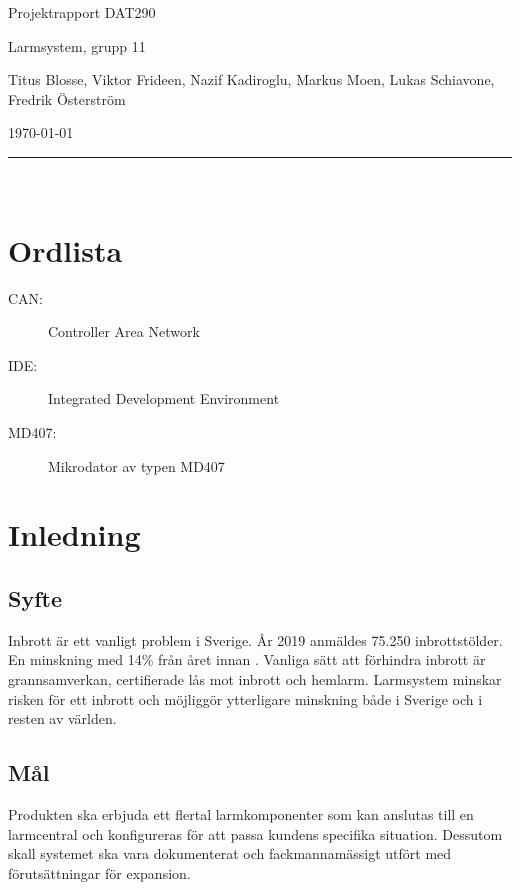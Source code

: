 \documentclass[a4paper]{article}
\newcommand\namn{Larmsystem}
\begin{document}
\thispagestyle{empty}

\begin{center}
    \parskip=14pt
    \vspace*{3\parskip}

    {\LARGE Projektrapport DAT290}

    {\large \namn, grupp 11

    Titus Blosse, Viktor Frideen, Nazif Kadiroglu, Markus Moen, Lukas Schiavone, Fredrik Österström

    \today}

    \rule{7cm}{0.4pt}\\
\end{center}
\newpage

\thispagestyle{empty}

\tableofcontents
\newpage


\section*{Ordlista}

\begin{description}
    \item[CAN:] Controller Area Network
    \item[IDE:] Integrated Development Environment
    \item[MD407:] Mikrodator av typen MD407
\end{description}
\newpage

\section{Inledning}
\subsection{Syfte}
Inbrott är ett vanligt problem i Sverige. År 2019 anmäldes 75.250 inbrottstölder. En minskning med 14\% från året innan \cite{brastold}. Vanliga sätt att förhindra inbrott är grannsamverkan, certifierade lås mot inbrott och hemlarm. Larmsystem minskar risken för ett inbrott och möjliggör ytterligare minskning både i Sverige och i resten av världen.

\subsection{Mål}

Produkten ska erbjuda ett flertal larmkomponenter som kan anslutas till en larmcentral och konfigureras för att passa kundens specifika situation. Dessutom skall systemet ska vara dokumenterat och fackmannamässigt utfört med förutsättningar för expansion.
\end{document}
